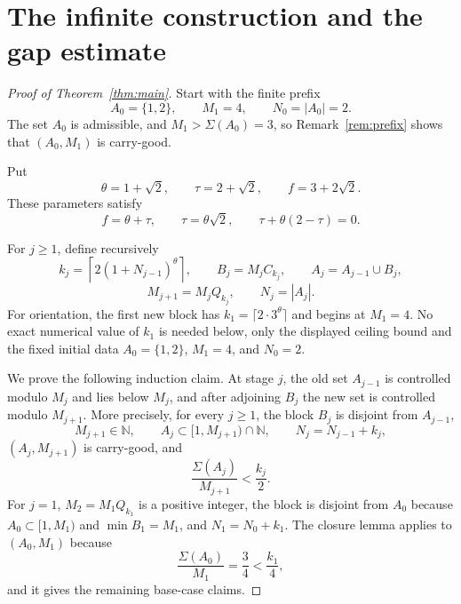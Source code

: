 \documentclass[11pt]{article}
\newcommand{\N}{\mathbb{N}}
\newcommand{\Sig}{\Sigma}
\begin{document}
\section{The infinite construction and the gap estimate}

\begin{proof}[Proof of Theorem~\ref{thm:main}]
Start with the finite prefix
\[
        A_0=\{1,2\},
        \qquad
        M_1=4,
        \qquad
        N_0=|A_0|=2.
\]
The set $A_0$ is admissible, and $M_1>\Sig(A_0)=3$, so Remark~\ref{rem:prefix} shows that $(A_0,M_1)$ is carry-good.

Put
\[
        \theta=1+\sqrt2,
        \qquad
        \tau=2+\sqrt2,
        \qquad
        f=3+2\sqrt2.
\]
These parameters satisfy
\[
        f=\theta+\tau,
        \qquad
        \tau=\theta\sqrt2,
        \qquad
        \tau+\theta(2-\tau)=0.
\]

For $j\ge1$, define recursively
\[
        k_j=\left\lceil 2(1+N_{j-1})^{\theta}\right\rceil,
        \qquad
        B_j=M_j C_{k_j},
        \qquad
        A_j=A_{j-1}\cup B_j,
\]
\[
        M_{j+1}=M_j Q_{k_j},
        \qquad
        N_j=|A_j|.
\]
For orientation, the first new block has $k_1=\lceil 2\cdot3^\theta\rceil$ and begins at $M_1=4$.  No exact numerical value of $k_1$ is needed below, only the displayed ceiling bound and the fixed initial data $A_0=\{1,2\}$, $M_1=4$, and $N_0=2$.

We prove the following induction claim.  At stage $j$, the old set $A_{j-1}$ is controlled modulo $M_j$ and lies below $M_j$, and after adjoining $B_j$ the new set is controlled modulo $M_{j+1}$.  More precisely, for every $j\ge1$, the block $B_j$ is disjoint from $A_{j-1}$,
\[
        M_{j+1}\in\N,
        \qquad
        A_j\subset[1,M_{j+1})\cap\N,
        \qquad
        N_j=N_{j-1}+k_j,
\]
$(A_j,M_{j+1})$ is carry-good, and
\[
        \frac{\Sig(A_j)}{M_{j+1}}<\frac{k_j}{2}.
\]
For $j=1$, $M_2=M_1Q_{k_1}$ is a positive integer, the block is disjoint from $A_0$ because $A_0\subset[1,M_1)$ and $\min B_1=M_1$, and $N_1=N_0+k_1$.  The closure lemma applies to $(A_0,M_1)$ because
\[
        \frac{\Sig(A_0)}{M_1}=\frac34<\frac{k_1}{4},
\]
and it gives the remaining base-case claims.


\end{proof}
\end{document}
